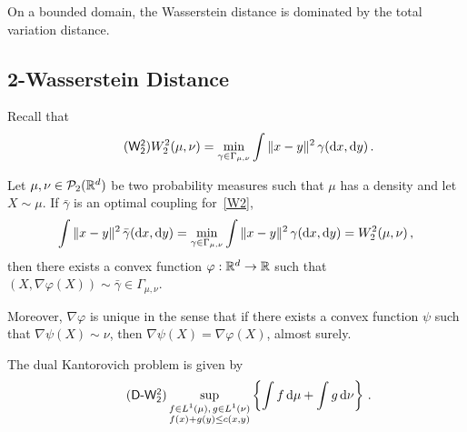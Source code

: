 On a bounded domain, the Wasserstein distance is dominated by the total variation distance.
\begin{theorem}
    
\end{theorem}


\begin{example}
    
\end{example}

\subsection{2-Wasserstein Distance}
Recall that
\begin{equation}\label{W2}\tag{$\mathsf{W_2^2}$}
W_2^2(\mu, \nu)=\min_{\gamma \in \Gamma_{\mu, \nu}}\int \|x-y\|^2\, \gamma(\d x,\d y)\,.
\end{equation}

\begin{theorem}[Brenier]\label{thm:brenier}
Let $\mu, \nu \in \mathcal{P}_2(\mathbb{R}^d)$ be two probability measures such that $\mu$ has a density and let $X \sim \mu$. If $\bar \gamma$ is an optimal coupling for~\eqref{W2},
$$
\int \|x-y\|^2\, \bar \gamma(\mathrm{d} x,\mathrm{d} y)=\min_{\gamma \in \Gamma_{\mu, \nu}}\int \|x-y\|^2 \,\gamma(\mathrm{d} x,\mathrm{d} y)=W_2^2(\mu, \nu)\,,
$$
then there exists a convex function $\varphi:\mathbb{R}^d \to \mathbb{R}$ such that $(X, \nabla \varphi(X))\sim \bar \gamma \in \Gamma_{\mu, \nu}$.

Moreover, $\nabla \varphi$ is unique in the sense that if there exists a convex function $\psi$ such that $\nabla\psi(X) \sim \nu$, then $\nabla \psi(X) = \nabla \varphi(X)$, almost surely.
\end{theorem}

The dual Kantorovich problem is given by
\begin{equation}
\label{DK}\tag{\textsf{D-}$\mathsf{W_2^2}$}
\sup_{\substack{ f \in L^1(\mu),\, g\in L^1(\nu)\\f(x) +g(y)\le c(x,y)} }\left\{\int f\, \d \mu + \int g\, \d \nu\right\}\,.
\end{equation}

